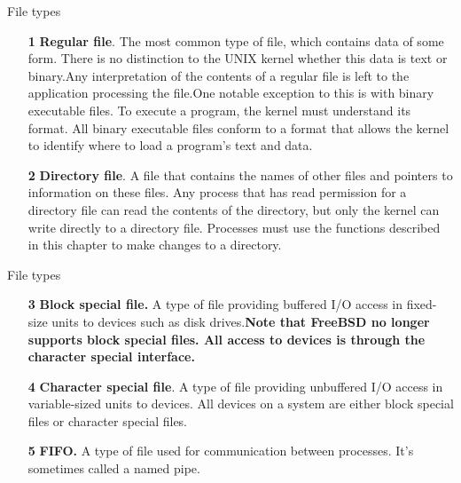 \documentclass{beamer}
\begin{document}
\begin{frame}[t]{File types} \vspace*{4 pt}
\begin{enumerate}
	\item[\textbf{1}] \textbf{Regular file}. The most common type of file, which contains data of some form.	There is no distinction to the UNIX kernel whether this data is text or binary.Any interpretation of the contents of a regular file is left to the application	processing the file.One notable exception to this is with binary executable files. To execute a program, the	kernel must understand its format. All binary executable files conform to a format that allows the kernel to identify where to load a program’s text and data.
	\item[\textbf{2}] \textbf{Directory file}. A file that contains the names of other files and pointers to information on these files. Any process that has read permission for a directory	file can read the contents of the directory, but only the kernel can write directly to a directory file. Processes must use the functions described in this chapter to	make changes to a directory.


\end{enumerate}






\end{frame}
 \begin{frame}[t]{File types}\vspace*{4pt}
\begin{enumerate}
	
	\item[\textbf{3}] \textbf{Block special file. } A type of file providing buffered I/O access in fixed-size units	to devices such as disk drives.\textbf{Note that FreeBSD no longer supports block special files. All access to devices is through the character special interface.}
	\item[\textbf{4}]\textbf{Character special file}. A type of file providing unbuffered I/O access in	variable-sized units to devices. All devices on a system are either block special	files or character special files. 
	\item[\textbf{5}]\textbf{FIFO.} A type of file used for communication between processes. It’s sometimes called a named pipe.
	
	
	
	
	
\end{enumerate}




\end{frame}
  
\end{document}

